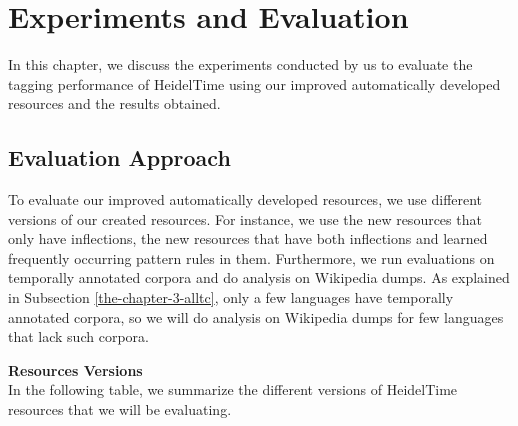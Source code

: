 \chapter{Experiments and Evaluation} \label{the-chapter-5}

In this chapter, we discuss the experiments conducted by us to evaluate the tagging performance of HeidelTime using our improved automatically developed resources and the results obtained.
 
\section{Evaluation Approach}
To evaluate our improved automatically developed resources, we use different versions of our created resources. For instance, we use the new resources that only have inflections, the new resources that have both inflections and learned frequently occurring pattern rules in them. Furthermore, we run evaluations on temporally annotated corpora and do analysis on Wikipedia dumps. As explained in Subsection \ref{the-chapter-3-alltc}, only a few languages have temporally annotated corpora, so we will do analysis on Wikipedia dumps for few languages that lack such corpora.

\textbf{Resources Versions}\\
In the following table, we summarize the different versions of HeidelTime resources that we will be evaluating. 

